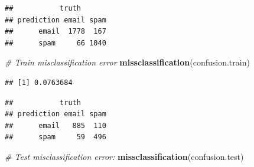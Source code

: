 \documentclass[]{book}
\newenvironment{Shaded}{\begin{snugshade}}{\end{snugshade}}
\newcommand{\KeywordTok}[1]{\textcolor[rgb]{0.13,0.29,0.53}{\textbf{#1}}}
\newcommand{\DataTypeTok}[1]{\textcolor[rgb]{0.13,0.29,0.53}{#1}}
\newcommand{\DecValTok}[1]{\textcolor[rgb]{0.00,0.00,0.81}{#1}}
\newcommand{\StringTok}[1]{\textcolor[rgb]{0.31,0.60,0.02}{#1}}
\newcommand{\CommentTok}[1]{\textcolor[rgb]{0.56,0.35,0.01}{\textit{#1}}}
\newcommand{\OperatorTok}[1]{\textcolor[rgb]{0.81,0.36,0.00}{\textbf{#1}}}
\newcommand{\NormalTok}[1]{#1}
\theoremstyle{definition}
\theoremstyle{definition}
\theoremstyle{definition}
\theoremstyle{remark}
\begin{document}
\begin{verbatim}
##           truth
## prediction email spam
##      email  1778  167
##      spam     66 1040
\end{verbatim}

\begin{Shaded}
\begin{Highlighting}[]
\CommentTok{# Train misclassification error}
\KeywordTok{missclassification}\NormalTok{(confusion.train)}
\end{Highlighting}
\end{Shaded}

\begin{verbatim}
## [1] 0.0763684
\end{verbatim}

\begin{Shaded}
\end{Shaded}

\begin{verbatim}
##           truth
## prediction email spam
##      email   885  110
##      spam     59  496
\end{verbatim}

\begin{Shaded}
\begin{Highlighting}[]
\CommentTok{# Test misclassification error:}
\KeywordTok{missclassification}\NormalTok{(confusion.test)}
\end{Highlighting}
\end{Shaded}
\end{document}
